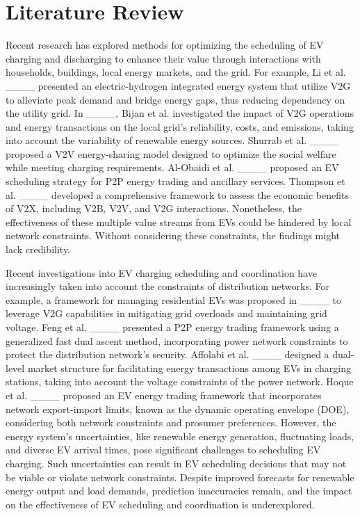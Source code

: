 \section{Literature Review}
\label{LR}

Recent research has explored methods for optimizing the scheduling of EV charging and discharging to enhance their value through interactions with households, buildings, local energy markets, and the grid. For example, Li et al. ____ presented an electric-hydrogen integrated energy system that utilize V2G to alleviate peak demand and bridge energy gaps, thus reducing dependency on the utility grid. In ____, Bijan et al. investigated the impact of V2G operations and energy transactions on the local grid's reliability, costs, and emissions, taking into account the variability of renewable energy sources. Shurrab et al. ____ proposed a V2V energy-sharing model designed to optimize the social welfare while meeting charging requirements. Al-Obaidi et al. ____ proposed an EV scheduling strategy for P2P energy trading and ancillary services. Thompson et al. ____ developed a comprehensive framework to assess the economic benefits of V2X, including V2B, V2V, and V2G interactions. Nonetheless, the effectiveness of these multiple value streams from EVs could be hindered by local network constraints. Without considering these constraints, the findings might lack credibility. 

Recent investigations into EV charging scheduling and coordination have increasingly taken into account the constraints of distribution networks. For example, a framework for managing residential EVs was proposed in ____ to leverage V2G capabilities in mitigating grid overloads and maintaining grid voltage. Feng et al. ____ presented a P2P energy trading framework using a generalized fast dual ascent method, incorporating power network constraints to protect the distribution network's security. Affolabi et al. ____ designed a dual-level market structure for facilitating energy transactions among EVs in charging stations, taking into account the voltage constraints of the power network. Hoque et al. ____ proposed an EV energy trading framework that incorporates network export-import limits, known as the dynamic operating envelope (DOE), considering both network constraints and prosumer preferences. However, the energy system's uncertainties, like renewable energy generation, fluctuating loads, and diverse EV arrival times, pose significant challenges to scheduling EV charging. Such uncertainties can result in EV scheduling decisions that may not be viable or violate network constraints. Despite improved forecasts for renewable energy output and load demands, prediction inaccuracies remain, and the impact on the effectiveness of EV scheduling and coordination is underexplored. 

